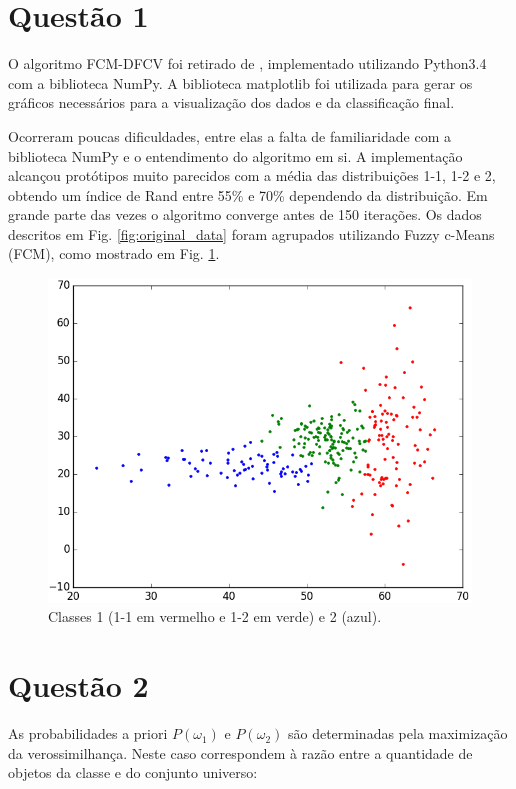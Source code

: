 \documentclass[12pt,twoside]{report}
\newcommand{\figureref}[1]{Fig. \ref{fig:#1}}
\newcommand{\captiontext}[1]{\small{#1}}
\begin{document}
\chapter*{Questão 1}

O algoritmo FCM-DFCV foi retirado de \autocite{carvalho.tenorio.cavalcanti.2006},
implementado utilizando Python3.4 com a biblioteca NumPy. A biblioteca matplotlib
foi utilizada para gerar os gráficos necessários para a visualização dos dados e
da classificação final.

Ocorreram poucas dificuldades, entre elas a falta de familiaridade com a biblioteca
NumPy e o entendimento do algoritmo em si. A implementação alcançou protótipos
muito parecidos com a média das distribuições 1-1, 1-2 e 2, obtendo um índice de
Rand entre 55\% e 70\% dependendo da distribuição. Em grande parte das vezes o
algoritmo converge antes de 150 iterações. Os dados descritos em \figureref{original_data}
foram agrupados utilizando Fuzzy c-Means (FCM), como mostrado em \figureref{clusters}.

\begin{figure}[H]
    \centering
    \includegraphics[scale=0.5]{clusters}
    \caption{\captiontext{Classes 1 (1-1 em vermelho e 1-2 em verde) e 2 (azul).}}
    \label{fig:clusters}
\end{figure}


\chapter*{Questão 2}

As probabilidades a priori $P(\omega_1)$ e $P(\omega_2)$ são determinadas pela
maximização da verossimilhança. Neste caso correspondem à razão entre a quantidade
de objetos da classe e do conjunto universo:
\end{document}
